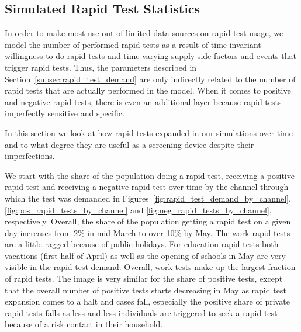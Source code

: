 \subsection{Simulated Rapid Test Statistics}
\label{subsec:results_rapid_test_statistics}

In order to make most use out of limited data sources on rapid test usage, we model the
number of performed rapid tests as a result of time invariant willingness to do rapid
tests and time varying supply side factors and events that trigger rapid tests. Thus,
the parameters described in Section~\ref{subsec:rapid_test_demand} are only indirectly
related to the number of rapid tests that are actually performed in the model. When it
comes to positive and negative rapid tests, there is even an additional layer because
rapid tests imperfectly sensitive and specific.

In this section we look at how rapid tests expanded in our simulations over time and to
what degree they are useful as a screening device despite their imperfections.

We start with the share of the population doing a rapid test, receiving a positive rapid
test and receiving a negative rapid test over time by the channel through which the test
was demanded in Figures~\ref{fig:rapid_test_demand_by_channel},
\ref{fig:pos_rapid_tests_by_channel} and \ref{fig:neg_rapid_tests_by_channel},
respectively. Overall, the share of the population getting a rapid test on a given day
increases from 2\% in mid March to over 10\% by May. The work rapid tests are a little
ragged because of public holidays. For education rapid tests both vacations (first half
of April) as well as the opening of schools in May are very visible in the rapid test
demand. Overall, work tests make up the largest fraction of rapid tests. The image is
very similar for the share of positive tests, except that the overall number of positive
tests starts decreasing in May as rapid test expansion comes to a halt and cases fall,
especially the positive share of private rapid tests falls as less and less individuals
are triggered to seek a rapid test because of a risk contact in their household.

